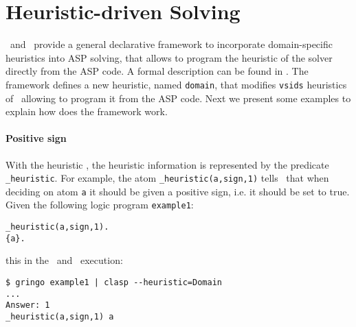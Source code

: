 

\section{Heuristic-driven Solving}
\label{sec:heuristic}


%
%
%


\clasp\ and \clingo\ provide a general declarative framework to incorporate domain-specific heuristics into ASP solving,  
that allows to program the heuristic of the solver directly from the ASP code.
A formal description can be found in \cite{gekaotroscwa13a}.
The framework defines a new heuristic, named \texttt{domain},
that modifies \texttt{vsids} heuristics of \clasp\ allowing to program it from the ASP code.
Next we present some examples to explain how does the framework work.

\paragraph{Positive sign}

With the heuristic , the heuristic information is represented by the predicate \texttt{\_heuristic}.
For example, the atom \texttt{\_heuristic(a,sign,1)} tells  \clasp\ that  when deciding on atom \texttt{a}
it should be given a positive sign, i.e. it should be set to true.
Given the following logic program \texttt{example1}:
\begin{verbatim}
_heuristic(a,sign,1).
{a}.
\end{verbatim}
this in the \gringo\ and \clasp\ execution:
\begin{verbatim}
$ gringo example1 | clasp --heuristic=Domain
...
Answer: 1
_heuristic(a,sign,1) a
\end{verbatim}

